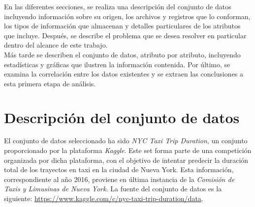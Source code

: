 \documentclass[12pt]{article}
\begin{document}
En las diferentes secciones, se realiza una descripción del conjunto de datos incluyendo información sobre su origen, los archivos y registros que lo conforman, los tipos de información que almacenan y detalles particulares de los atributos que incluye. Después, se describe el problema que se desea resolver en particular dentro del alcance de este trabajo.\\

Más tarde se describen el conjunto de datos, atributo por atributo, incluyendo estadísticas y gráficas que ilustren la información contenida. Por último,  se examina la correlación entre los datos existentes y se extraen las conclusiones a esta primera etapa de análisis.

\section{Descripción del conjunto de datos}
El conjunto de datos seleccionado ha sido \textit{NYC Taxi Trip Duration}, un conjunto proporcionado por la plataforma \textit{Kaggle}. Este set forma parte de una competición organizada por dicha plataforma, con el objetivo de intentar predecir la duración total de los trayectos en taxi en la ciudad de Nueva York. Esta información, correspondiente al año 2016, proviene en última instancia de la \textit{Comisión de Taxis y Limusinas de Nueva York}. La fuente del conjunto de datos es la siguiente: \url{https://www.kaggle.com/c/nyc-taxi-trip-duration/data}.\\
\end{document}
